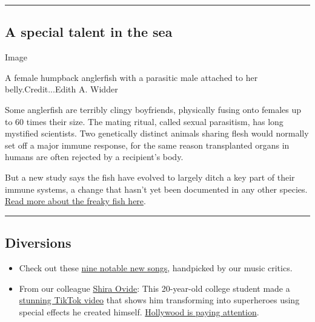 \begin{center}\rule{0.5\linewidth}{\linethickness}\end{center}

\hypertarget{a-special-talent-in-the-sea}{%
\subsection{A special talent in the
sea}\label{a-special-talent-in-the-sea}}

Image

A female humpback anglerfish with a parasitic male attached to her
belly.Credit...Edith A. Widder

Some anglerfish are terribly clingy boyfriends, physically fusing onto
females up to 60 times their size. The mating ritual, called sexual
parasitism, has long mystified scientists. Two genetically distinct
animals sharing flesh would normally set off a major immune response,
for the same reason transplanted organs in humans are often rejected by
a recipient's body.

But a new study says the fish have evolved to largely ditch a key part
of their immune systems, a change that hasn't yet been documented in any
other species.
\href{https://www.nytimes3xbfgragh.onion/2020/07/30/science/anglerfish-immune-rejection.html}{Read
more about the freaky fish here}.

\begin{center}\rule{0.5\linewidth}{\linethickness}\end{center}

\hypertarget{diversions}{%
\subsection{Diversions}\label{diversions}}

\begin{itemize}
\item
  Check out these
  \href{https://www.nytimes3xbfgragh.onion/2020/07/31/arts/music/playlist-billie-eilish-snakehips-a-boogie.html}{nine
  notable new songs}, handpicked by our music critics.
\item
  From our colleague
  \href{https://www.nytimes3xbfgragh.onion/newsletters/signup/OT}{Shira
  Ovide}: This 20-year-old college student made a
  \href{https://www.tiktok.com/@thejulianbass/video/6844906456471457030?lang=en}{stunning
  TikTok video} that shows him transforming into superheroes using
  special effects he created himself.
  \href{https://www.kqed.org/arts/13882973/a-student-gets-supersized-attention-after-superhero-video-goes-viral}{Hollywood
  is paying attention}.
\end{itemize}

